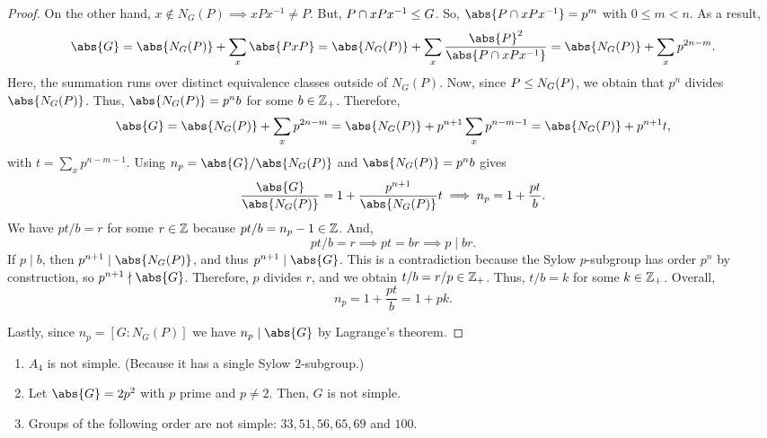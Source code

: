 \documentclass[11pt]{penrose}
\begin{document}
\begin{proof}
    On the other hand, $x \notin N_{G}(P) \implies xPx^{-1} \neq P$. But, $P \cap xPx^{-1} \mathrel{\leq} G$. So, $\abs{P \cap xPx^{-1}} = p^{m}$ with $0 \leq m < n$. As a result,
    \begin{equation*}
        \abs{G}
        = \abs{N_{G}(P)} + \sum_{x} \abs{PxP}
        = \abs{N_{G}(P)} + \sum_{x} \frac{\abs{P}^{2}}{\abs{P \cap xPx^{-1}}}
        = \abs{N_{G}(P)} + \sum_{x} p^{2n-m}.
    \end{equation*}
    Here, the summation runs over distinct equivalence classes outside of $N_{G}(P)$. Now, since $P \mathrel{\leq} N_{G}(P)$, we obtain that $p^{n}$ divides $\abs{N_{G}(P)}$. Thus, $\abs{N_{G}(P)} = p^{n}b$ for some $b \in \mathbb{Z}_{+}$. Therefore,
    \begin{equation*}
        \abs{G}
        = \abs{N_{G}(P)} + \sum_{x} p^{2n-m}
        = \abs{N_{G}(P)} + p^{n+1} \sum_{x} p^{n-m-1}
        = \abs{N_{G}(P)} + p^{n+1} t,
    \end{equation*}
    with $t = \sum_{x} p^{n-m-1}$. Using $n_{p} = \abs{G}/\abs{N_{G}(P)}$ and $\abs{N_{G}(P)} = p^{n}b$ gives
    \begin{equation*}
        \frac{\abs{G}}{\abs{N_{G}(P)}} = 1 + \frac{p^{n+1}}{\abs{N_{G}(P)}} t
        \implies
        n_{p} = 1 + \frac{pt}{b}.
    \end{equation*}
    We have $pt/b = r$ for some $r \in \mathbb{Z}$ because $pt/b = n_{p} - 1 \in \mathbb{Z}$. And,
    \begin{equation*}
        pt/b = r
        \implies
        pt = br
        \implies
        p \mid br.
    \end{equation*}
    If $p \mid b$, then $p^{n+1} \mid \abs{N_{G}(P)}$, and thus $p^{n+1} \mid \abs{G}$. This is a contradiction because the Sylow $p$-subgroup has order $p^{n}$ by construction, so $p^{n+1} \nmid \abs{G}$. Therefore, $p$ divides $r$, and we obtain $t/b = r/p \in \mathbb{Z}_{+}$. Thus, $t/b = k$ for some $k \in \mathbb{Z}_{+}$. Overall,
    \begin{equation*}
        n_{p} = 1 + \frac{pt}{b} = 1 + pk.
    \end{equation*}

    Lastly, since $n_{p} = [G : N_{G}(P)]$ we have $n_{p} \mid \abs{G}$ by Lagrange's theorem.
\end{proof}

\begin{nex}\phantom{}
    \begin{enumerate}
        \item $A_{4}$ is not simple. (Because it has a single Sylow $2$-subgroup.)
        \item Let $\abs{G} = 2 p^{2}$ with $p$ prime and $p \neq 2$. Then, $G$ is not simple.
        \item Groups of the following order are not simple: $33, 51, 56, 65, 69$ and $100$.
    \end{enumerate}
\end{nex}
\end{document}
